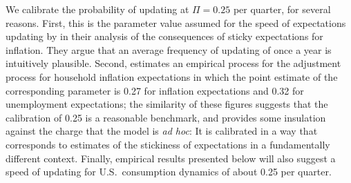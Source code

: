 \documentclass[titlepage]{article}
\begin{document}
We calibrate the probability of updating at $\Pi= %
0.25 %
 $ per quarter, for several reasons.  First, this is the parameter value assumed for the speed of expectations updating by \cite{mrSlumps} in their analysis of the consequences of sticky expectations for inflation.  They argue that an average frequency of updating of once a year is intuitively plausible.  Second, \cite{carroll:epidemicinflQJE} estimates an empirical process for the adjustment process for household inflation expectations in which the point estimate of the corresponding parameter is 0.27 for inflation expectations and 0.32 for unemployment expectations; the similarity of these figures suggests that the \cite{mrSlumps} calibration of 0.25 is a reasonable benchmark, and provides some insulation against the charge that the model is {\it ad hoc}: It is calibrated in a way that corresponds to estimates of the stickiness of expectations in a fundamentally different context.  Finally, empirical results presented below will also suggest a speed of updating for U.S.\ consumption dynamics of about 0.25 per quarter.
\end{document}

